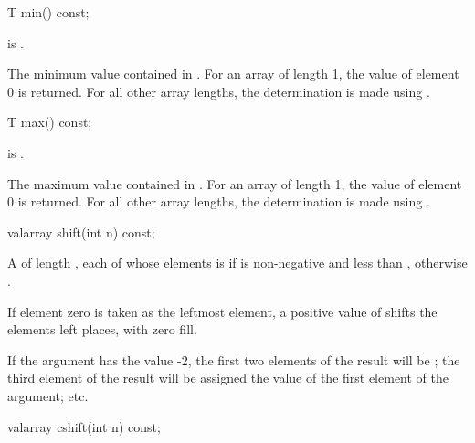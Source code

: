 %
\begin{itemdecl}
T min() const;
\end{itemdecl}

\begin{itemdescr}
\pnum
\expects
{} is .

\pnum
\returns
The minimum value contained in .
For an array of length 1, the value of element 0 is returned.
For all other array
lengths, the determination is made using
.
\end{itemdescr}

%
\begin{itemdecl}
T max() const;
\end{itemdecl}

\begin{itemdescr}
\pnum
\expects
{} is .

\pnum
\returns
The maximum value contained in .
For an array of length 1, the value of element 0 is returned.
For all other array
lengths, the determination is made using
.
\end{itemdescr}

%
\begin{itemdecl}
valarray shift(int n) const;
\end{itemdecl}

\begin{itemdescr}
\pnum
\returns
A  of length , each of whose elements
 is
if 
is non-negative and less than
, otherwise .
\begin{note}
If element zero is taken as the leftmost element,
a positive value of  shifts the elements left 
places, with zero fill.
\end{note}

\pnum
\begin{example}
If the argument has the value -2,
the first two elements of the result will be
; the third element of the result will be assigned the value
of the first element of the argument; etc.
\end{example}
\end{itemdescr}

%
\begin{itemdecl}
valarray cshift(int n) const;
\end{itemdecl}

